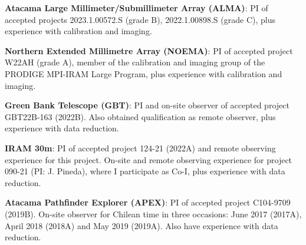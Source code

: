 \vspace{8pt}

\begin{cvparagraph}
	
\textbf{Atacama Large Millimeter/Submillimeter Array (ALMA)}: %
{PI of accepted projects 2023.1.00572.S (grade B), 2022.1.00898.S (grade C), plus experience with calibration and imaging.} %

\textbf{Northern Extended Millimetre Array (NOEMA)}: %
{PI of accepted project W22AH (grade A), member of the calibration and imaging group of the PRODIGE MPI-IRAM Large Program, plus experience with calibration and imaging.} %
	
\textbf{Green Bank Telescope (GBT)}: %
{PI and on-site observer of accepted project GBT22B-163 (2022B). Also obtained qualification as remote observer, plus experience with data reduction.} 

\textbf{IRAM 30m}: %
{PI of accepted project 124-21 (2022A) and remote observing experience for this project. On-site and remote observing experience for project 090-21 (PI: J. Pineda), where I participate as Co-I, plus experience with data reduction.} %

\textbf{Atacama Pathfinder Explorer (APEX)}: %
{PI of accepted project C104-9709 (2019B). On-site observer for Chilean time in three occasions: June 2017 (2017A), April 2018 (2018A) and May 2019 (2019A). Also have experience with data reduction.} 

\end{cvparagraph}

%
%	
%	
%
%	
%	
